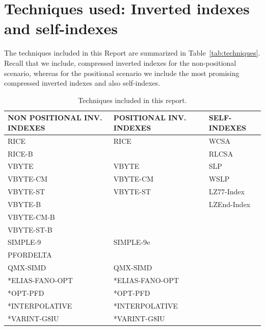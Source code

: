 \documentclass[review]{elsarticle}
\begin{document}
\section{Techniques used: Inverted indexes and self-indexes}
The techniques included  in this Report are summarized in Table~\ref{tab:techniques}. Recall that we include, compressed inverted indexes for the non-positional scenario, whereas for the positional scenario we include the most promising compressed inverted indexes and also self-indexes.

\begin{table}[htbp]
	\caption{Techniques included in this report.}
	\begin{center}
	
	\scriptsize
	\begin{tabular}{|l|l|l|}
	\hline
	\textbf{NON POSITIONAL INV. INDEXES} & \textbf{POSITIONAL INV. INDEXES} & \textbf{SELF-INDEXES} \\ \hline
	\hline
	\hline
	RICE                      &  RICE                    & WCSA \\ \hline
	RICE-B              &                          & RLCSA \\ \hline
	VBYTE                     &  VBYTE                   & SLP \\ \hline
	VBYTE-CM                  &  VBYTE-CM                & WSLP \\ \hline
	VBYTE-ST                  &  VBYTE-ST                & LZ77-Index \\ \hline
	VBYTE-B              &                          & LZEnd-Index \\ \hline
	VBYTE-CM-B           &                          & \multicolumn{1}{c|}{} \\ \hline
	VBYTE-ST-B &                          &  \\ \hline
	SIMPLE-9                  &  SIMPLE-9e                &  \\ \hline
	PFORDELTA                 &                          &  \\ \hline
	QMX-SIMD                  &  QMX-SIMD                &  \\ \hline
	*ELIAS-FANO-OPT           &  *ELIAS-FANO-OPT         &  \\ \hline
	*OPT-PFD                  &  *OPT-PFD                &  \\ \hline
	*INTERPOLATIVE            &  *INTERPOLATIVE          &  \\ \hline
	*VARINT-G8IU              &  *VARINT-G8IU            &  \\ \hline

\end{tabular}
\end{center}
\end{table}
\end{document}
